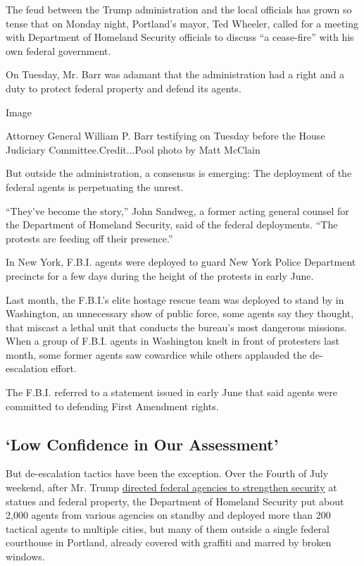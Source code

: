 The feud between the Trump administration and the local officials has
grown so tense that on Monday night, Portland's mayor, Ted Wheeler,
called for a meeting with Department of Homeland Security officials to
discuss ``a cease-fire'' with his own federal government.

On Tuesday, Mr. Barr was adamant that the administration had a right and
a duty to protect federal property and defend its agents.

Image

Attorney General William P. Barr testifying on Tuesday before the House
Judiciary Committee.Credit...Pool photo by Matt McClain

But outside the administration, a consensus is emerging: The deployment
of the federal agents is perpetuating the unrest.

``They've become the story,'' John Sandweg, a former acting general
counsel for the Department of Homeland Security, said of the federal
deployments. ``The protests are feeding off their presence.''

In New York, F.B.I. agents were deployed to guard New York Police
Department precincts for a few days during the height of the protests in
early June.

Last month, the F.B.I.'s elite hostage rescue team was deployed to stand
by in Washington, an unnecessary show of public force, some agents say
they thought, that miscast a lethal unit that conducts the bureau's most
dangerous missions. When a group of F.B.I. agents in Washington knelt in
front of protesters last month, some former agents saw cowardice while
others applauded the de-escalation effort.

The F.B.I. referred to a statement issued in early June that said agents
were committed to defending First Amendment rights.

\hypertarget{low-confidence-in-our-assessment}{%
\subsection{`Low Confidence in Our
Assessment'}\label{low-confidence-in-our-assessment}}

But de-escalation tactics have been the exception. Over the Fourth of
July weekend, after Mr. Trump
\href{https://www.nytimes.com/2020/06/26/us/politics/trump-monuments-executive-order.html}{directed
federal agencies to strengthen security} at statues and federal
property, the Department of Homeland Security put about 2,000 agents
from various agencies on standby and deployed more than 200 tactical
agents to multiple cities, but many of them outside a single federal
courthouse in Portland, already covered with graffiti and marred by
broken windows.

